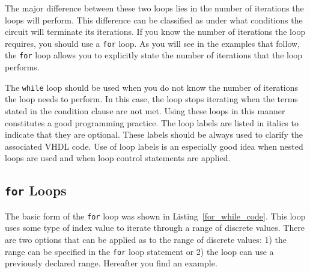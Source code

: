 The major difference between these two loops lies in the number of iterations the loops will perform. This difference can be classified as under what conditions the circuit will terminate its iterations. If you know the number of iterations the loop requires, you should use a \texttt{for} loop. As you will see in the examples that follow, the \texttt{for} loop allows you to explicitly state the number of iterations that the loop performs. 

The \texttt{while} loop should be used when you do not know the number of iterations the loop needs to perform. In this case, the loop stops iterating when the terms stated in the condition clause are not met. Using these loops in this manner constitutes a good programming practice. The loop labels are listed in italics to indicate that they are optional. These labels should be always used to clarify the associated VHDL code. Use of loop labels is an especially good idea when nested loops are used and when loop control statements are applied. 

\subsection{\texttt{for} Loops}
The basic form of the \texttt{for} loop was shown in Listing~\ref{for_while_code}. This loop uses some type of index value to iterate through a range of discrete values. There are two options that can be applied as to the range of discrete values: 1) the range can be specified in the \texttt{for} loop statement or 2) the loop can use a previously declared range. Hereafter you find  an example.

